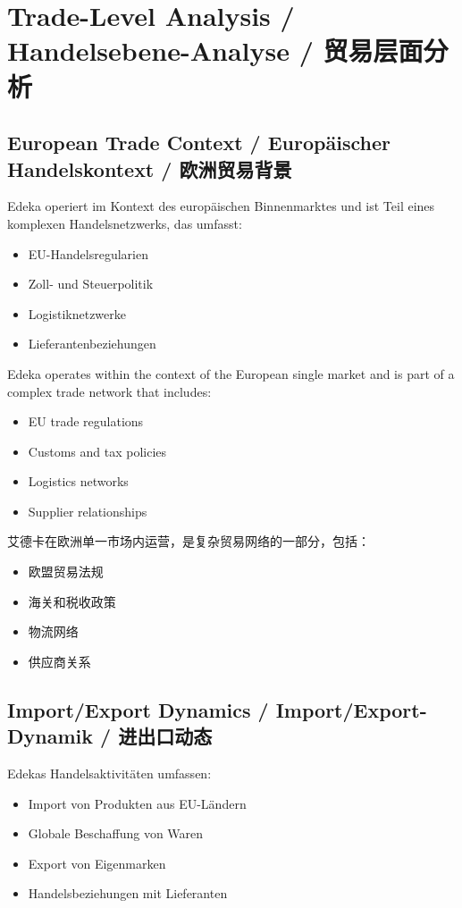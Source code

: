 \chapter{Trade-Level Analysis / Handelsebene-Analyse / 贸易层面分析}

\section{European Trade Context / Europäischer Handelskontext / 欧洲贸易背景}

\begin{otherlanguage}{ngerman}
Edeka operiert im Kontext des europäischen Binnenmarktes und ist Teil eines komplexen Handelsnetzwerks, das umfasst:
\begin{itemize}
    \item EU-Handelsregularien
    \item Zoll- und Steuerpolitik
    \item Logistiknetzwerke
    \item Lieferantenbeziehungen
\end{itemize}
\end{otherlanguage}

Edeka operates within the context of the European single market and is part of a complex trade network that includes:
\begin{itemize}
    \item EU trade regulations
    \item Customs and tax policies
    \item Logistics networks
    \item Supplier relationships
\end{itemize}

艾德卡在欧洲单一市场内运营，是复杂贸易网络的一部分，包括：
\begin{itemize}
    \item 欧盟贸易法规
    \item 海关和税收政策
    \item 物流网络
    \item 供应商关系
\end{itemize}

\section{Import/Export Dynamics / Import/Export-Dynamik / 进出口动态}

\begin{otherlanguage}{ngerman}
Edekas Handelsaktivitäten umfassen:
\begin{itemize}
    \item Import von Produkten aus EU-Ländern
    \item Globale Beschaffung von Waren
    \item Export von Eigenmarken
    \item Handelsbeziehungen mit Lieferanten
\end{itemize}
\end{otherlanguage}

